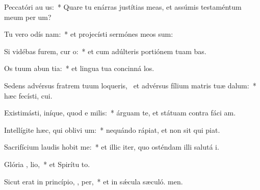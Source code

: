 \item Peccatóri au  us:~* Quare tu enárras justítias meas, et assúmis testaméntum meum per  um?
\item Tu vero odís nam:~* et projecísti sermónes meos sum:
\item Si vidébas furem, cur  o:~* et cum adúlteris portiónem tuam bas.
\item Os tuum abun tia:~* et lingua tua concinná los.
\item Sedens advérsus fratrem tuum loqueris,~\pscross{} et advérsus fílium matris tuæ  dalum:~* hæc fecísti,  cui.
\item Existimásti, iníque, quod e  milis:~* árguam te, et státuam contra fáci am.
\item Intellígite hæc, qui oblivi um:~* nequándo rápiat, et non sit qui piat.
\item Sacrifícium laudis hobit me:~* et illic iter, quo osténdam illi salutá i.
\item Glória ,  lio,~* et Spirítu to.
\item Sicut erat in princípio,  ,  per,~* et in sǽcula sæculó. men.
